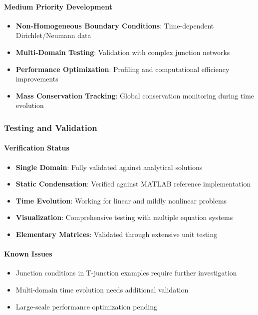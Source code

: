 \paragraph{Medium Priority Development}
\begin{itemize}
    \item \textbf{Non-Homogeneous Boundary Conditions}: Time-dependent Dirichlet/Neumann data
    \item \textbf{Multi-Domain Testing}: Validation with complex junction networks
    \item \textbf{Performance Optimization}: Profiling and computational efficiency improvements
    \item \textbf{Mass Conservation Tracking}: Global conservation monitoring during time evolution
\end{itemize}

\subsubsection{Testing and Validation}

\paragraph{Verification Status}
\begin{itemize}
    \item \textbf{Single Domain}: Fully validated against analytical solutions
    \item \textbf{Static Condensation}: Verified against MATLAB reference implementation
    \item \textbf{Time Evolution}: Working for linear and mildly nonlinear problems
    \item \textbf{Visualization}: Comprehensive testing with multiple equation systems
    \item \textbf{Elementary Matrices}: Validated through extensive unit testing
\end{itemize}

\paragraph{Known Issues}
\begin{itemize}
    \item Junction conditions in T-junction examples require further investigation
    \item Multi-domain time evolution needs additional validation
    \item Large-scale performance optimization pending
\end{itemize}

